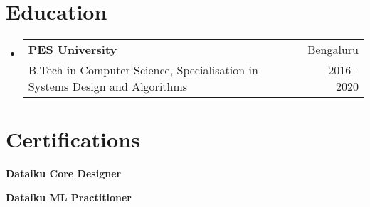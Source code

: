 \documentclass[a4paper,20pt]{article}
\makeatletter
\newcommand{\resumeSubheading}[4]{
  \vspace{0pt}\item
    \begin{tabular*}{0.97\textwidth}[t]{l@{\extracolsep{\fill}}r}
      \textbf{#1} & #2 \\
      {\small#3} & {\small #4} \\
    \end{tabular*}\vspace{1pt}
}
\newcommand{\resumeSubHeadingListStart}{\begin{itemize}[leftmargin=0in, label={}]}
\newcommand{\resumeSubHeadingListEnd}{\end{itemize}}
\makeatother
\begin{document}
\section{Education}
  \resumeSubHeadingListStart
    \resumeSubheading
      {PES University}{Bengaluru}
      {B.Tech in Computer Science, Specialisation in Systems Design and Algorithms}{2016 - 2020}
  \resumeSubHeadingListEnd


\section{Certifications}
  \begin{itemize}[leftmargin=0in, label={}]
    \small{\item{
     \textbf{Dataiku Core Designer} 
    }
    \item{
     \textbf{Dataiku ML Practitioner}
    }}
 \end{itemize}


\end{document}
